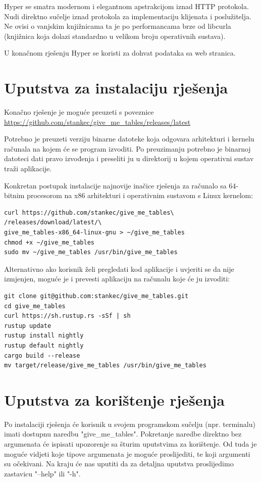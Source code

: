\documentclass[times, utf8, zavrsni]{fer}
\begin{document}
Hyper se smatra modernom i elegantnom apstrakcijom iznad HTTP protokola.
Nudi direktno sučelje iznad protokola za implementaciju klijenata i
poslužitelja.
Ne ovisi o vanjskim knjižnicama ta je po performancama brze od libcurla
(knjižnica koja dolazi standardno u velikom broju operativnih sustava).

U konačnom rješenju Hyper se koristi za dohvat podataka sa web stranica.

\section{Uputstva za instalaciju rješenja}

Konačno rješenje je moguće preuzeti s poveznice
\url{https://github.com/stankec/give_me_tables/releases/latest}

Potrebno je preuzeti verziju binarne datoteke koja odgovara arhitekturi i
kernelu računala na kojem će se program izvoditi. Po preuzimanju potrebno je
binarnoj datoteci dati pravo izvođenja i preseliti ju u direktorij u kojem
operativni sustav traži aplikacije.

Konkretan postupak instalacije najnovije inačice rješenja za računalo sa
64-bitnim procesorom na x86 arhitekturi i operativnim sustavom s Linux kernelom:

\begin{lstlisting}
curl https://github.com/stankec/give_me_tables\
/releases/download/latest/\
give_me_tables-x86_64-linux-gnu > ~/give_me_tables
chmod +x ~/give_me_tables
sudo mv ~/give_me_tables /usr/bin/give_me_tables
\end{lstlisting}

Alternativno ako korisnik želi pregledati kod aplikacije i uvjeriti se da nije
izmjenjen, moguće je i prevesti aplikaciju na računalu koje će ju izvoditi:

\begin{lstlisting}
git clone git@github.com:stankec/give_me_tables.git
cd give_me_tables
curl https://sh.rustup.rs -sSf | sh
rustup update
rustup install nightly
rustup default nightly
cargo build --release
mv target/release/give_me_tables /usr/bin/give_me_tables
\end{lstlisting}

\section{Uputstva za korištenje rješenja}

Po instalaciji rješenja će korisnik u svojem programskom sučelju
(npr. terminalu) imati dostupnu naredbu "give\_me\_tables". Pokretanje naredbe
direktno bez argumenata će ispisati upozorenje sa šturim uputstvima za
korištenje. Od tuda je moguće vidjeti koje tipove argumenata je moguće
proslijediti, te koji argumenti su očekivani. Na kraju će nas uputiti da za
detaljna uputstva proslijedimo zastavicu "--help" ili "-h".
\end{document}

